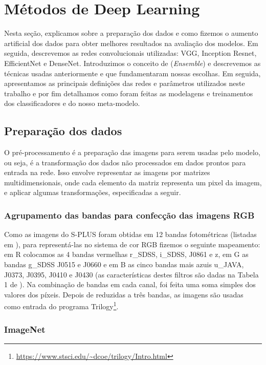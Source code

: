 \section{Métodos de Deep Learning}
\label{section:metodos}

Nesta seção, explicamos sobre a preparação dos dados e como fizemos o aumento artificial dos dados para obter melhores resultados na avaliação dos modelos. Em seguida, descrevemos as redes convolucionais utilizadas: VGG, Inception Resnet, EfficientNet e DenseNet. Introduzimos o conceito de (\emph{Ensemble}) e descrevemos as técnicas usadas anteriormente e que fundamentaram nossas escolhas. Em seguida, apresentamos as principais definições das redes e parâmetros utilizados neste trabalho e por fim detalhamos como foram feitas as modelagens e treinamentos dos classificadores e do nosso meta-modelo.

\subsection{Preparação dos dados}
\label{section:preparacao}

O pré-processamento é a preparação das imagens para serem usadas pelo modelo, ou seja, é a transformação dos dados não processados em dados prontos para entrada na rede. Isso envolve representar as imagens por matrizes multidimensionais, onde cada elemento da matriz representa um pixel da imagem, e aplicar algumas transformações, especificadas a seguir.

\subsubsection{Agrupamento das bandas para confecção das imagens RGB}

Como as imagens do S-PLUS foram obtidas em 12 bandas fotométricas (listadas em \cite{oliveira2019}), para representá-las no sistema de cor RGB fizemos o seguinte mapeamento: em R colocamos as 4 bandas vermelhas r\_SDSS, i\_SDSS, J0861 e z, em G as bandas g\_SDSS J0515 e J0660 e em B as cinco bandas mais azuis u\_JAVA, J0373, J0395, J0410 e J0430 (as características destes filtros são dadas na Tabela 1 de \cite{oliveira2019}). Na combinação de bandas em cada canal, foi feita uma soma simples dos valores dos píxeis. Depois de reduzidas a três bandas, as imagens são usadas como entrada do programa Trilogy\cite{coe2012clash}\footnote{\url{https://www.stsci.edu/~dcoe/trilogy/Intro.html}}.

\subsubsection{ImageNet}


